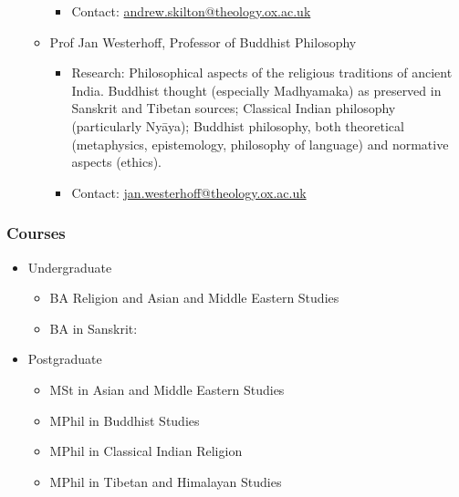 \documentclass[11pt]{article}
\begin{document}
\begin{itemize}
\begin{itemize}
\begin{itemize}
\item Contact: \href{mailto:andrew.skilton@theology.ox.ac.uk}{andrew.skilton@theology.ox.ac.uk}\\
\end{itemize}
\item Prof Jan Westerhoff, Professor of Buddhist Philosophy
\label{sec:org6d502ac}
\begin{itemize}
\item Research: Philosophical aspects of the religious traditions of ancient India. Buddhist thought (especially Madhyamaka) as preserved in Sanskrit and Tibetan sources; Classical Indian philosophy (particularly Nyāya); Buddhist philosophy, both theoretical (metaphysics, epistemology, philosophy of language) and normative aspects (ethics).\\
\item Contact: \href{mailto:jan.westerhoff@theology.ox.ac.uk}{jan.westerhoff@theology.ox.ac.uk}\\
\end{itemize}
\end{itemize}
\end{itemize}
\subsubsection*{Courses}
\label{sec:org0a2de93}
\begin{itemize}
\item Undergraduate
\label{sec:org2b37e47}
\begin{itemize}
\item BA Religion and Asian and Middle Eastern Studies\\
\item BA in Sanskrit:\\
\end{itemize}
\item Postgraduate
\label{sec:org6422d5a}
\begin{itemize}
\item MSt in Asian and Middle Eastern Studies\\
\item MPhil in Buddhist Studies\\
\item MPhil in Classical Indian Religion\\
\item MPhil in Tibetan and Himalayan Studies\\
\end{itemize}
\end{itemize}
\end{document}
